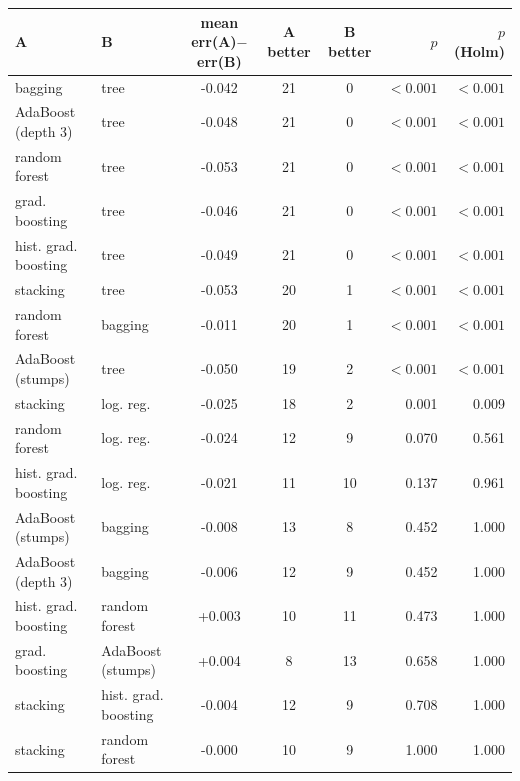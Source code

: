 \begin{tabular}{llcccrr}
\toprule
A & B & mean err(A)$-$err(B) & A better & B better & $p$ & $p$ (Holm) \\
\midrule
bagging & tree & -0.042 & 21 & 0 & $<0.001$ & $<0.001$ \\
AdaBoost (depth 3) & tree & -0.048 & 21 & 0 & $<0.001$ & $<0.001$ \\
random forest & tree & -0.053 & 21 & 0 & $<0.001$ & $<0.001$ \\
grad. boosting & tree & -0.046 & 21 & 0 & $<0.001$ & $<0.001$ \\
hist. grad. boosting & tree & -0.049 & 21 & 0 & $<0.001$ & $<0.001$ \\
stacking & tree & -0.053 & 20 & 1 & $<0.001$ & $<0.001$ \\
random forest & bagging & -0.011 & 20 & 1 & $<0.001$ & $<0.001$ \\
AdaBoost (stumps) & tree & -0.050 & 19 & 2 & $<0.001$ & $<0.001$ \\
stacking & log. reg. & -0.025 & 18 & 2 & 0.001 & 0.009 \\
random forest & log. reg. & -0.024 & 12 & 9 & 0.070 & 0.561 \\
hist. grad. boosting & log. reg. & -0.021 & 11 & 10 & 0.137 & 0.961 \\
AdaBoost (stumps) & bagging & -0.008 & 13 & 8 & 0.452 & 1.000 \\
AdaBoost (depth 3) & bagging & -0.006 & 12 & 9 & 0.452 & 1.000 \\
hist. grad. boosting & random forest & +0.003 & 10 & 11 & 0.473 & 1.000 \\
grad. boosting & AdaBoost (stumps) & +0.004 & 8 & 13 & 0.658 & 1.000 \\
stacking & hist. grad. boosting & -0.004 & 12 & 9 & 0.708 & 1.000 \\
stacking & random forest & -0.000 & 10 & 9 & 1.000 & 1.000 \\
\bottomrule
\end{tabular}
